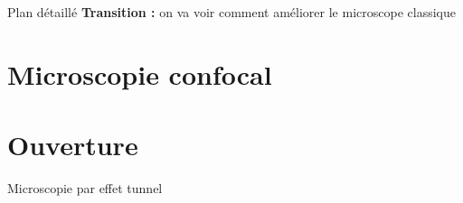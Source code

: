 \begin{reportBlock}{Plan détaillé}
\textbf{Transition :} on va voir comment améliorer le microscope classique

\section{Microscopie confocal}

\section*{Ouverture}
Microscopie par effet tunnel

\end{reportBlock}